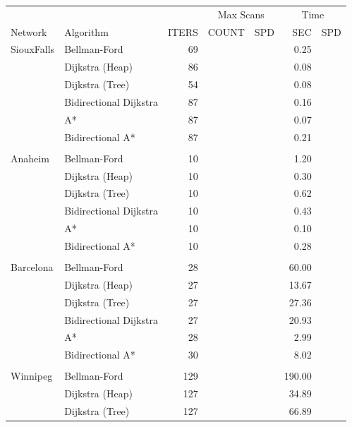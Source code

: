 \begin{table}
    \centering
    \begin{tabular}{l l r rr rr } \toprule
        & & & \multicolumn{2}{c}{Max Scans} & \multicolumn{2}{c}{Time} \\ 
        \cmidrule(lr){4-5}
        \cmidrule(lr){6-7}
        Network & Algorithm & ITERS & COUNT & SPD                     & SEC & SPD \\ 
        \cmidrule(lr){1-1}
        \cmidrule(lr){2-2}
        \cmidrule(lr){3-3}
        \cmidrule(lr){4-4}
        \cmidrule(lr){5-5}
        \cmidrule(lr){6-6}
        \cmidrule(lr){7-7}
        SiouxFalls    & Bellman-Ford     & 69 & & & 0.25 & \\
        & Dijkstra (Heap) & 86 & & & 0.08 & \\
        & Dijkstra (Tree) & 54 & & & 0.08 & \\
        & Bidirectional Dijkstra & 87 & & & 0.16 & \\
        & A*    & 87 & & & 0.07 & \\
        & Bidirectional A* & 87 & & & 0.21 & \\ \\
        Anaheim       & Bellman-Ford    & 10 & & & 1.20 & \\
        & Dijkstra (Heap) & 10 & & & 0.30 & \\
        & Dijkstra (Tree) & 10 & & & 0.62 & \\
        & Bidirectional Dijkstra  & 10 & & & 0.43 & \\
        & A*    & 10 & & & 0.10 & \\
        & Bidirectional A* & 10 & & & 0.28 & \\ \\
        Barcelona     & Bellman-Ford    & 28 & & & 60.00 & \\
        & Dijkstra (Heap) & 27 & & & 13.67 & \\
        & Dijkstra (Tree) & 27 & & & 27.36 & \\
        & Bidirectional Dijkstra  & 27 & & & 20.93 & \\
        & A*    & 28 & & &  2.99 & \\
        & Bidirectional A* & 30 & & & 8.02 & \\ \\
        Winnipeg      & Bellman-Ford    & 129 & & & 190.00 & \\
        & Dijkstra (Heap) & 127 & & &  34.89 & \\
        & Dijkstra (Tree) & 127 & & &  66.89 & \\

\end{tabular}
\end{table}
